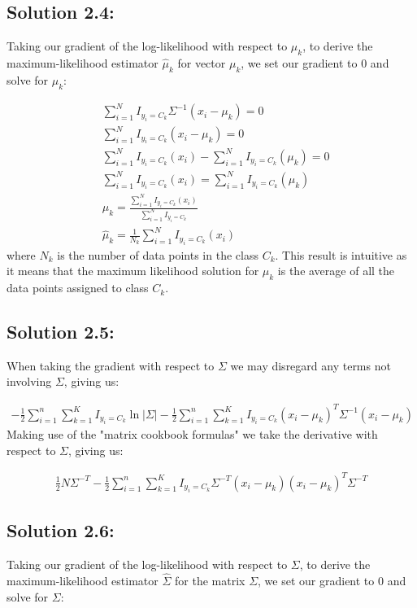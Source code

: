 \documentclass[submit]{harvardml}
\begin{document}
\subsection*{Solution 2.4:}
Taking our gradient of the log-likelihood with respect to $\mu_k$, to derive the maximum-likelihood estimator $\hat \mu_k$ for vector $\mu_k$, we set our gradient to $0$ and solve for $\mu_k$:

\begin{align*}
    &\sum_{i=1}^{N}I_{y_i=C_k}\Sigma^{-1}(x_i- \mu_k) = 0 \\
    &\sum_{i=1}^{N}I_{y_i=C_k}(x_i- \mu_k) = 0 \\
    &\sum_{i=1}^{N}I_{y_i=C_k}(x_i)- \sum_{i=1}^{N}I_{y_i=C_k}(\mu_k) = 0 \\
    &\sum_{i=1}^{N}I_{y_i=C_k}(x_i) = \sum_{i=1}^{N}I_{y_i=C_k}(\mu_k) \\
    &\mu_k = \frac{\sum_{i=1}^{N}I_{y_i=C_k}(x_i)}{\sum_{i=1}^{N}I_{y_i=C_k}} \\
    &\hat \mu_k = \frac{1}{N_k}\sum_{i=1}^{N}I_{y_i=C_k}(x_i)
\end{align*}
where $N_k$ is the number of data points in the class $C_k$. This result is intuitive as it means that the maximum likelihood solution for $\mu_k$ is the average of all the data points assigned to class $C_k$.

\subsection*{Solution 2.5:}

When taking the gradient with respect to $\Sigma$ we may disregard any terms not involving $\Sigma$, giving us:

\begin{align*}
     -\frac{1}{2}\sum_{i=1}^n \sum_{k=1}^K I_{y_i=C_k} \ln|\Sigma| -\frac{1}{2}\sum_{i=1}^n \sum_{k=1}^K I_{y_i=C_k} (x_i - \mu_k)^T \Sigma^{-1}(x_i - \mu_k)
\end{align*}
Making use of the "matrix cookbook formulas" we take the derivative with respect to $\Sigma$, giving us:

\begin{align*}
    \frac{1}{2}N\Sigma^{-T} - \frac{1}{2}\sum_{i=1}^n \sum_{k=1}^K I_{y_i=C_k} \Sigma^{-T}(x_i - \mu_k)(x_i - \mu_k)^T \Sigma^{-T}
\end{align*}

\subsection*{Solution 2.6:}
Taking our gradient of the log-likelihood with respect to $\Sigma$, to derive the maximum-likelihood estimator $\hat \Sigma$ for the matrix $\Sigma$, we set our gradient to $0$ and solve for $\Sigma$:
\end{document}
